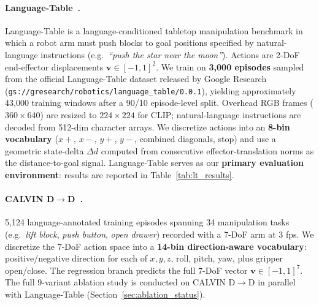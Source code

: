 \documentclass{article}
\begin{document}
\paragraph{Language-Table~\citep{lynch2023languagetable}.}
Language-Table is a language-conditioned tabletop manipulation benchmark
in which a robot arm must push blocks to goal positions specified by
natural-language instructions (e.g.\ \textit{``push the star near the moon''}).
Actions are 2-DoF end-effector displacements $\mathbf{v}\!\in\![-1,1]^2$.
We train on \textbf{3,000 episodes} sampled from the official Language-Table
dataset released by Google Research
(\texttt{gs://gresearch/robotics/language\_table/0.0.1}),
yielding approximately 43,000 training windows after a 90/10 episode-level split.
Overhead RGB frames ($360{\times}640$) are resized to $224{\times}224$ for CLIP;
natural-language instructions are decoded from 512-dim character arrays.
We discretize actions into an \textbf{8-bin vocabulary}
($x{+}$, $x{-}$, $y{+}$, $y{-}$, combined diagonals, stop)
and use a geometric state-delta $\Delta d$ computed from
consecutive effector-translation norms as the distance-to-goal signal.
Language-Table serves as our \textbf{primary evaluation environment}:
results are reported in Table~\ref{tab:lt_results}.

\paragraph{CALVIN D$\to$D~\citep{mees2022calvin}.}
5,124 language-annotated training episodes spanning 34 manipulation tasks
(e.g.\ \textit{lift block}, \textit{push button}, \textit{open drawer})
recorded with a 7-DoF arm at 3 fps.
We discretize the 7-DoF action space into a \textbf{14-bin direction-aware
vocabulary}: positive/negative direction for each of $x, y, z$, roll, pitch, yaw,
plus gripper open/close.
The regression branch predicts the full 7-DoF vector
$\mathbf{v}\!\in\![-1,1]^7$.
The full 9-variant ablation study is conducted on CALVIN D$\to$D
in parallel with Language-Table (Section~\ref{sec:ablation_status}).
\end{document}

